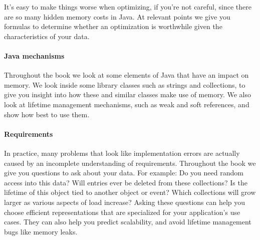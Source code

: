 It's easy to make things
worse when optimizing, if you're not careful, since there are so many hidden memory costs
in Java. At relevant points we give you formulas to
determine whether an optimization is worthwhile given the characteristics of your data.

\paragraph{Java mechanisms}Throughout the book we look at some
elements of Java that have an impact on memory. We look inside some library
classes such as strings and collections, to give you insight into how these and
similar classes make use of memory.
We also look at lifetime management mechanisms, such as weak and soft references,
and show how best to use them.

\paragraph{Requirements}In practice, many problems that look like implementation
errors are actually caused by an incomplete understanding of requirements. Throughout the book we
give you questions to ask about your data. For example: Do you need random access into this data? Will entries ever be deleted from these collections? Is the lifetime of this object tied to another object or event? Which
collections will grow larger as various aspects of load increase?  Asking these
questions can help you choose efficient representations that are specialized for your application's use cases.
They can also help you predict scalability, and avoid lifetime management bugs
like memory leaks.




